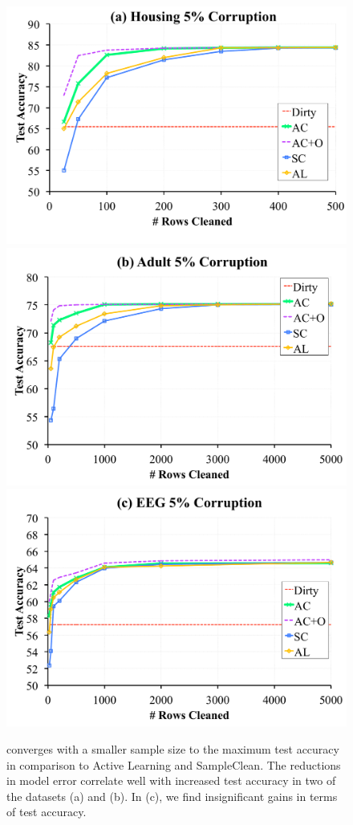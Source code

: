 \begin{figure}[t]
\centering
 \includegraphics[scale=0.15]{exp/exp3aa.pdf}
 \includegraphics[scale=0.15]{exp/exp3bb.pdf}
  \includegraphics[scale=0.15]{exp/exp3cc.pdf}
 \caption{\sys converges with a smaller sample size to the maximum test accuracy in comparison to Active Learning and SampleClean. The reductions in model error correlate well with increased test accuracy in two of the datasets (a) and (b). In (c), we find insignificant gains in terms of test accuracy. \label{prio-tperf}}
\end{figure}

